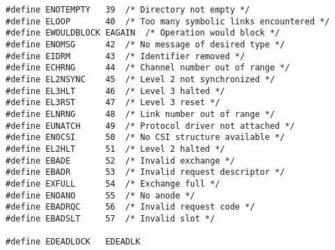 \begin{verbatim}
#define	ENOTEMPTY	39	/* Directory not empty */
#define	ELOOP		40	/* Too many symbolic links encountered */
#define	EWOULDBLOCK	EAGAIN	/* Operation would block */
#define	ENOMSG		42	/* No message of desired type */
#define	EIDRM		43	/* Identifier removed */
#define	ECHRNG		44	/* Channel number out of range */
#define	EL2NSYNC	45	/* Level 2 not synchronized */
#define	EL3HLT		46	/* Level 3 halted */
#define	EL3RST		47	/* Level 3 reset */
#define	ELNRNG		48	/* Link number out of range */
#define	EUNATCH		49	/* Protocol driver not attached */
#define	ENOCSI		50	/* No CSI structure available */
#define	EL2HLT		51	/* Level 2 halted */
#define	EBADE		52	/* Invalid exchange */
#define	EBADR		53	/* Invalid request descriptor */
#define	EXFULL		54	/* Exchange full */
#define	ENOANO		55	/* No anode */
#define	EBADRQC		56	/* Invalid request code */
#define	EBADSLT		57	/* Invalid slot */

#define	EDEADLOCK	EDEADLK


\end{verbatim}
